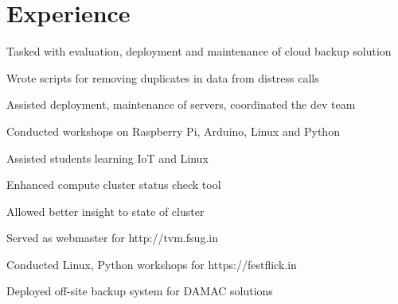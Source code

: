 \documentclass[]{resume_karuvally_openfont}
\begin{document}
\begin{minipage}[t]{0.66\textwidth} 


\section{Experience}

\vspace{\topsep} %
\begin{tightemize}
\item Tasked with evaluation, deployment and maintenance of cloud backup
    solution
\end{tightemize}
\sectionsep

\begin{tightemize}
\item Wrote scripts for removing duplicates in data from distress calls
\item Assisted deployment, maintenance of servers, coordinated the dev team
\end{tightemize}
\sectionsep

\begin{tightemize}
\item Conducted workshops on Raspberry Pi, Arduino, Linux and Python
\item Assisted students learning IoT and Linux
\end{tightemize}
\sectionsep

\begin{tightemize}
    \item Enhanced compute cluster status check tool
    \begin{tightemize}
        \item Allowed better insight to state of cluster
    \end{tightemize}
\end{tightemize}
\sectionsep

\begin{tightemize}
    \item Served as webmaster for http://tvm.fsug.in
    \item Conducted Linux, Python workshops for https://festflick.in
    \item Deployed off-site backup system for DAMAC solutions
\end{tightemize}
\sectionsep


\end{minipage}
\end{document}
